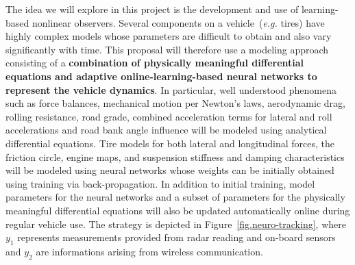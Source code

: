 \documentclass[a4paper,11pt]{article}
\makeatletter
\newcounter {subsubsubsection}[subsubsection]
\newcommand\subsubsubsection{\@startsection{subsubsubsection}{4}{\z@}%
                                     {-3.25ex\@plus -1ex \@minus -.2ex}%
                                     {1.5ex \@plus .2ex}%
                                     {\normalfont\normalsize\bfseries}}
\makeatother
\begin{document}
The idea we will explore in this project is the development and use of learning-based nonlinear observers. Several components on a vehicle~({\it e.g.} tires) have highly complex models whose parameters are difficult to obtain and also vary significantly with time.
%
%
This proposal will therefore use a modeling approach consisting of a {\bf combination of physically meaningful differential equations and adaptive online-learning-based neural networks to represent the vehicle dynamics}. In particular, well understood phenomena such as force balances, mechanical motion per Newton's laws, aerodynamic drag, rolling resistance, road grade, combined acceleration terms for lateral and roll accelerations and road bank angle influence will be modeled using analytical differential equations. Tire models for both lateral and longitudinal forces, the friction circle, engine maps, and suspension stiffness and damping characteristics will be modeled using neural networks whose weights can be initially obtained using training via back-propagation. In addition to initial training, model parameters for the neural networks and a subset of parameters for the physically meaningful differential equations will also be updated automatically online during regular vehicle use. The strategy is depicted in Figure~\ref{fig.neuro-tracking}, where $y_1$ represents measurements provided from radar reading and on-board sensors and $y_2$ are informations arising from wireless communication.
\end{document}
